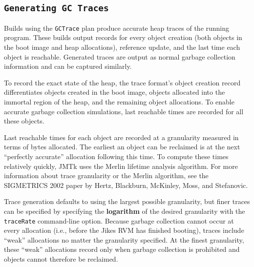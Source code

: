 \subsection{\texttt{Generating GC Traces}} \label{sssec:gctrace}
Builds using the \texttt{GCTrace} plan produce accurate heap traces of
the running program.  These builds output records for every object
creation (both objects in the boot image and heap allocations),
reference update, and the last time each object is reachable.
Generated traces are output as normal garbage collection information
and can be captured similarly.

To record the exact state of the heap, the trace format's object
creation record differentiates objects created in the boot image,
objects allocated into the immortal region of the heap, and the
remaining object allocations.  To enable accurate garbage collection
simulations, last reachable times are recorded for all these objects.

Last reachable times for each object are recorded at a granularity
measured in terms of bytes allocated.  The earliest an object can be
reclaimed is at the next ``perfectly accurate'' allocation following
this time.  To compute these times relatively quickly, JMTk uses the
Merlin lifetime analysis algorithm.  For more information about trace
granularity or the Merlin algorithm, see the SIGMETRICS 2002 paper by 
Hertz, Blackburn, McKinley, Moss, and Stefanovic.

Trace generation defaults to using the largest possible granularity,
but finer traces can be specified by specifying the \textbf{logarithm}
of the desired granularity with the \texttt{traceRate} command-line
option.  Because garbage collection cannot occur at every allocation
(i.e., before the Jikes RVM has finished booting), traces include
``weak'' allocations no matter the granularity specified.  At the
finest granularity, these ``weak'' allocations record only when
garbage collection is prohibited and objects cannot therefore be
reclaimed.

